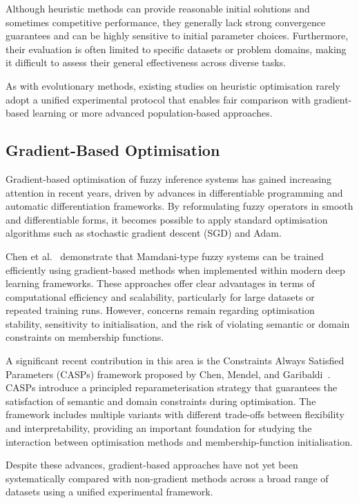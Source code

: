 \documentclass[a4paper,12pt,oneside]{article}
\begin{document}
Although heuristic methods can provide reasonable initial solutions and sometimes competitive performance, they generally lack strong convergence guarantees and can be highly sensitive to initial parameter choices. Furthermore, their evaluation is often limited to specific datasets or problem domains, making it difficult to assess their general effectiveness across diverse tasks.

As with evolutionary methods, existing studies on heuristic optimisation rarely adopt a unified experimental protocol that enables fair comparison with gradient-based learning or more advanced population-based approaches.

\subsection{Gradient-Based Optimisation}

Gradient-based optimisation of fuzzy inference systems has gained increasing attention in recent years, driven by advances in differentiable programming and automatic differentiation frameworks. By reformulating fuzzy operators in smooth and differentiable forms, it becomes possible to apply standard optimisation algorithms such as stochastic gradient descent (SGD) and Adam.

Chen et al.~\cite{chen2024gradient} demonstrate that Mamdani-type fuzzy systems can be trained efficiently using gradient-based methods when implemented within modern deep learning frameworks. These approaches offer clear advantages in terms of computational efficiency and scalability, particularly for large datasets or repeated training runs. However, concerns remain regarding optimisation stability, sensitivity to initialisation, and the risk of violating semantic or domain constraints on membership functions.

A significant recent contribution in this area is the Constraints Always Satisfied Parameters (CASPs) framework proposed by Chen, Mendel, and Garibaldi~\cite{chen2025casp}. CASPs introduce a principled reparameterisation strategy that guarantees the satisfaction of semantic and domain constraints during optimisation. The framework includes multiple variants with different trade-offs between flexibility and interpretability, providing an important foundation for studying the interaction between optimisation methods and membership-function initialisation.

Despite these advances, gradient-based approaches have not yet been systematically compared with non-gradient methods across a broad range of datasets using a unified experimental framework.
\end{document}
